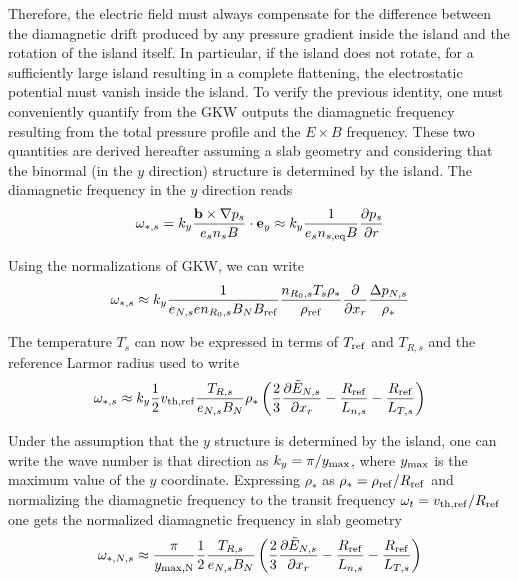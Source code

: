 Therefore, the electric field must always compensate for the difference between the diamagnetic drift produced by any pressure gradient inside the island and the rotation of the island itself. In particular,
if the island does not rotate, for a sufficiently large island resulting in a complete flattening, the electrostatic potential must vanish inside the island. To verify the previous identity, one must
 conveniently quantify from the GKW outputs the diamagnetic frequency resulting from the total pressure profile and the $E\times B$ frequency.
These two quantities are derived hereafter assuming a slab geometry and considering that the binormal (in the $y$ direction) structure is determined by the island. The diamagnetic frequency in the $y$ direction reads
\begin{equation}
\omega_{*,s} = k_y{{\mathbf{b}\times\nabla p_s}\over{e_sn_sB}}\cdot\mathbf{e}_y\approx k_y{1\over{e_sn_{s,\rm eq}B}}{\partial p_s\over{\partial r}}
\end{equation}

Using the normalizations of GKW, we can write
\begin{equation}
\omega_{*,s} \approx k_y{1\over{e_{N,s}en_{R_0,s}B_NB_{\rm ref}}}{{n_{R_0,s}T_s\rho_*}\over{\rho_{\rm ref}}}{\partial\over{\partial x_r}}{\Delta p_{N,s} \over \rho_*}
\end{equation}

The temperature $T_s$ can now be expressed in terms of $T_{\rm ref}$ and $T_{R,s}$ and the reference Larmor radius used to write
\begin{equation}
\omega_{*,s} \approx k_y{1\over 2}v_{\rm th,ref}{T_{R,s}\over e_{N,s}B_N}\rho_*\left({2\over 3}{\partial\tilde E_{N,s}\over\partial x_r} - {R_{\rm ref} \over L_{n,s}} - {R_{\rm ref} \over L_{T,s}}\right)
\end{equation}

Under the assumption that the $y$ structure is determined by the island, one can write the wave number is that direction as $k_y=\pi/y_{\rm max}$, where $y_{\rm max}$ is the maximum value of the $y$ coordinate. Expressing $\rho_*$ as $\rho_*=\rho_{\rm ref}/R_{\rm ref}$ and normalizing the diamagnetic frequency to the transit frequency $\omega_t = v_{\rm th,ref}/R_{\rm ref}$ one gets the normalized diamagnetic frequency in slab geometry
\begin{equation}
\omega_{*,N,s} \approx {\pi\over y_{\rm max,N}}{1\over 2}{T_{R,s}\over e_{N,s}B_N}\left({2\over 3}{\partial\tilde E_{N,s}\over\partial x_r} - {R_{\rm ref} \over L_{n,s}} - {R_{\rm ref} \over L_{T,s}}\right)
\end{equation}

